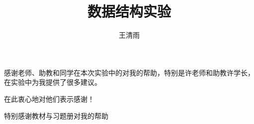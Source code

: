 \documentclass[format=draft,language=chinese,category=academic-report]{hustreport}
\title{数据结构实验}
\author{王清雨}
\begin{document}
\frontmatter
\maketitle
\tableofcontents

\mainmatter












\backmatter

\begin{ack}
	感谢老师、助教和同学在本次实验中的对我的帮助，特别是许老师和助教许学长，在实验中为我提供了很多建议。
	\par
	在此衷心地对他们表示感谢！
	\par
	特别感谢教材\cite{严蔚敏2002数据结构}与习题册\cite{严蔚敏1998数据结构题集}对我的帮助
\end{ack}



\appendix
\end{document}
